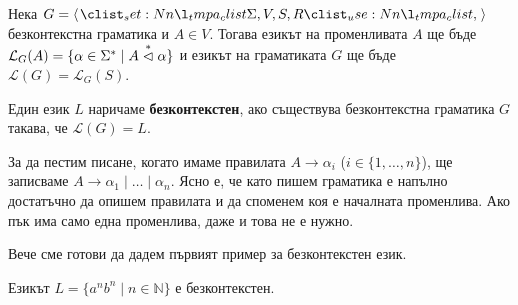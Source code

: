 \begin{definition}
    Нека $G = \opair{\Sigma, V, S, R}$ безконтекстна граматика и $A \in V$.
    Тогава езикът на променливата $A$ ще бъде $\mathcal{L}_G(A) = \{ \alpha \in \Sigma^* \mid A \stackrel{*}{\vartriangleleft} \alpha \}$ и езикът на граматиката $G$ ще бъде $\mathcal{L}(G) = \mathcal{L}_G(S)$.

    Един език $L$ наричаме \textbf{безконтекстен}, ако съществува безконтекстна граматика $G$ такава, че $\mathcal{L}(G) = L$.
\end{definition}

\begin{remark}
    За да пестим писане, когато имаме правилата $A \rightarrow \alpha_i$ ($i \in \{ 1, \dots, n \}$), ще записваме $A \rightarrow \alpha_1 \mid \dots \mid \alpha_n$.
    Ясно е, че като пишем граматика е напълно достатъчно да опишем правилата и да споменем коя е началната променлива.
    Ако пък има само една променлива, даже и това не е нужно.
\end{remark}

Вече сме готови да дадем първият пример за безконтекстен език.

\begin{claim}
    Езикът $L = \{ a^nb^n \mid n \in \mathbb{N} \}$ е безконтекстен.
\end{claim}

